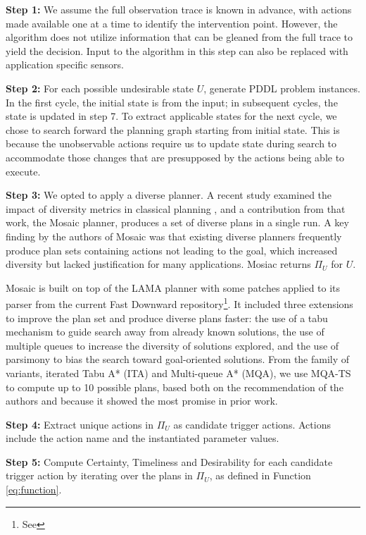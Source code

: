 \textbf{Step 1:} We assume the full observation trace is known in advance, with actions made available one at a time to identify the intervention point. However, the algorithm does not utilize information that can be gleaned from the full trace to yield the decision. Input to the algorithm in this step can also be replaced with application specific sensors.  

\textbf{Step 2:} For each possible undesirable state $U$, generate PDDL problem instances. In the first cycle, the initial state is from the input; in subsequent cycles, the state is updated in step 7. To extract applicable states for the next cycle, we chose to search forward the planning graph starting from initial state. This is because the unobservable actions require us to update state during search to accommodate those changes that are presupposed by the actions being able to execute. 

\textbf{Step 3:}
We opted to apply a diverse planner.  
A recent study examined the impact of diversity metrics in classical planning  \cite{roberts2014}, and a contribution from that work, the Mosaic planner, produces a set of diverse plans in a single run. 
A key finding by the authors of Mosaic was that existing diverse planners frequently produce plan sets containing actions not leading to the goal, which increased diversity but lacked justification for many applications. 
Mosiac returns $\Pi_U$ for $U$. 

Mosaic is built on top of the LAMA planner \cite{richterWestphal10.jair.LAMA}  with some patches applied to its parser from the current Fast Downward repository\footnote{See }. It included three extensions to improve the plan set and produce diverse plans faster: the use of a tabu mechanism to guide search away from already known solutions, the use of multiple queues to increase the diversity of solutions explored, and the use of parsimony to bias the search toward goal-oriented solutions. From the family of variants, iterated Tabu A* (ITA) and Multi-queue A* (MQA), we use MQA-TS to compute up to 10 possible plans, based both on the recommendation of the authors and because it showed the most promise in prior work. 

\textbf{Step 4:} Extract unique actions in $\Pi_U$ as candidate trigger actions. Actions include the action name and the instantiated parameter values.

\textbf{Step 5:} Compute Certainty, Timeliness and Desirability for each candidate trigger action by iterating over the plans in $\Pi_U$, as defined in Function \ref{eq:function}. 

